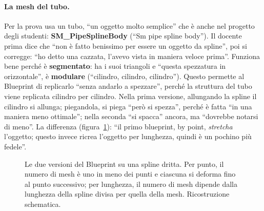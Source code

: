 \paragraph{La mesh del tubo.} Per la prova usa un tubo, ``un oggetto molto semplice'' che è
anche nel progetto degli studenti: \textbf{SM\_PipeSplineBody} (``Sm pipe spline body''). Il
docente prima dice che ``non è fatto benissimo per essere un oggetto da spline'', poi si
corregge: ``ho detto una cazzata, l'avevo vista in maniera veloce prima''. Funziona bene
perché è \textbf{segmentato}: ha i suoi triangoli e ``questa spezzatura in orizzontale'', è
\textbf{modulare} (``cilindro, cilindro, cilindro''). Questo permette al Blueprint di
replicarlo ``senza andarlo a spezzare'', perché la struttura del tubo viene replicata cilindro
per cilindro. Nella prima versione, allungando la spline il cilindro si allunga; piegandola,
si piega ``però si spezza'', perché è fatta ``in una maniera meno ottimale''; nella seconda ``si
spacca'' ancora, ma ``dovrebbe notarsi di meno''. La differenza (figura~\ref{ue16:fig:pointlength}):
``il primo blueprint, by point, \emph{stretcha} l'oggetto; questo invece ricrea l'oggetto per
lunghezza, quindi è un pochino più fedele''.

\begin{figure}[htbp]
\centering
{}
\caption{Le due versioni del Blueprint su una spline dritta. Per punto, il numero di mesh è
uno in meno dei punti e ciascuna si deforma fino al punto successivo; per lunghezza, il numero
di mesh dipende dalla lunghezza della spline divisa per quella della mesh. Ricostruzione
schematica.}
\label{ue16:fig:pointlength}
\end{figure}

